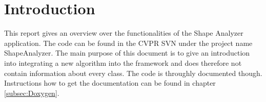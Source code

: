 
\chapter{Introduction}

This report gives an overview over the functionalities of the Shape Analyzer application. The code can be found in the CVPR SVN under the project name ShapeAnalyzer. The main purpose of this document is to give an introduction into integrating a new algorithm into the framework and does therefore not contain information about every class. The code is throughly documented though. Instructions how to get the documentation can be found in chapter \ref{subsec:Doxygen}.